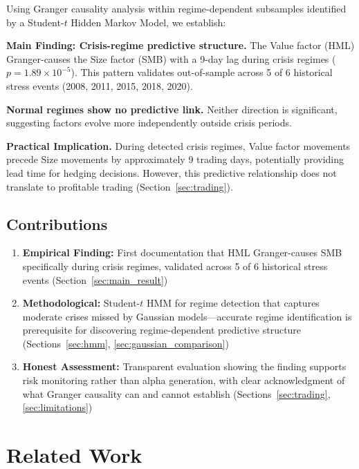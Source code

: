 \documentclass[sigconf]{acmart}
\begin{document}
Using Granger causality analysis within regime-dependent subsamples identified by
a Student-$t$ Hidden Markov Model, we establish:

\textbf{Main Finding: Crisis-regime predictive structure.} The Value factor (HML)
Granger-causes the Size factor (SMB) with a 9-day lag during crisis regimes
($p = 1.89 \times 10^{-5}$). This pattern validates out-of-sample across 5 of 6
historical stress events (2008, 2011, 2015, 2018, 2020).

\textbf{Normal regimes show no predictive link.} Neither direction is significant,
suggesting factors evolve more independently outside crisis periods.

\textbf{Practical Implication.} During detected crisis regimes, Value factor
movements precede Size movements by approximately 9 trading days, potentially
providing lead time for hedging decisions. However, this predictive relationship
does not translate to profitable trading (Section~\ref{sec:trading}).

\subsection{Contributions}

\begin{enumerate}
    \item \textbf{Empirical Finding:} First documentation that HML Granger-causes
    SMB specifically during crisis regimes, validated across 5 of 6 historical stress
    events (Section~\ref{sec:main_result})

    \item \textbf{Methodological:} Student-$t$ HMM for regime detection that captures
    moderate crises missed by Gaussian models---accurate regime identification is
    prerequisite for discovering regime-dependent predictive structure
    (Sections~\ref{sec:hmm}, \ref{sec:gaussian_comparison})

    \item \textbf{Honest Assessment:} Transparent evaluation showing the finding
    supports risk monitoring rather than alpha generation, with clear acknowledgment
    of what Granger causality can and cannot establish
    (Sections~\ref{sec:trading}, \ref{sec:limitations})
\end{enumerate}

\section{Related Work}
\end{document}
